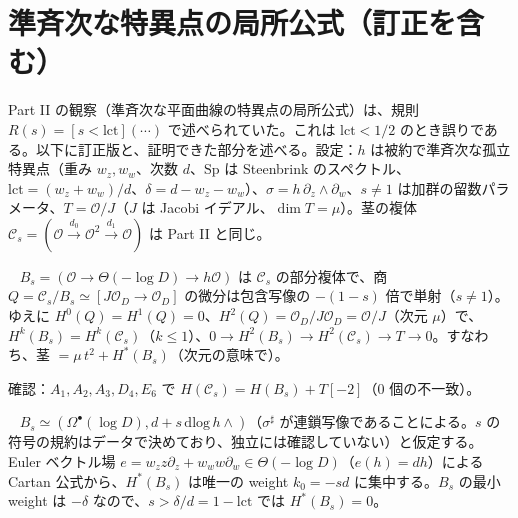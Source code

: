 \section{準斉次な特異点の局所公式（訂正を含む）}\label{p3:sec:local}
Part II の観察（準斉次な平面曲線の特異点の局所公式）は、規則 $R(s)=[s<\mathrm{lct}](\cdots)$ で述べられていた。これは $\mathrm{lct}<1/2$ のとき誤りである。以下に訂正版と、証明できた部分を述べる。設定：$h$ は被約で準斉次な孤立特異点（重み $w_z,w_w$、次数 $d$、$\mathrm{Sp}$ は Steenbrink のスペクトル、$\mathrm{lct}=(w_z+w_w)/d$、$\delta=d-w_z-w_w$）、$\sigma=h\,\partial_z\wedge\partial_w$、$s\ne1$ は加群の留数パラメータ、$T=\mathcal O/J$（$J$ は Jacobi イデアル、$\dim T=\mu$）。茎の複体 $\mathcal C_s=(\mathcal O\xrightarrow{d_0}\mathcal O^2\xrightarrow{d_1}\mathcal O)$ は Part II と同じ。
\begin{prop}\tP\ \tV\label{p3:prop:Q}
$B_s=(\mathcal O\to\Theta(-\log D)\to h\mathcal O)$ は $\mathcal C_s$ の部分複体で、商 $Q=\mathcal C_s/B_s\simeq[J\mathcal O_D\to\mathcal O_D]$ の微分は包含写像の $-(1-s)$ 倍で単射（$s\ne1$）。ゆえに $H^0(Q)=H^1(Q)=0$、$H^2(Q)=\mathcal O_D/J\mathcal O_D=\mathcal O/J$（次元 $\mu$）で、$H^k(B_s)=H^k(\mathcal C_s)$（$k\le1$）、$0\to H^2(B_s)\to H^2(\mathcal C_s)\to T\to0$。すなわち、茎 $=\mu\,t^2+H^*(B_s)$（次元の意味で）。
\end{prop}
\noindent 確認：$A_1,A_2,A_3,D_4,E_6$ で $H(\mathcal C_s)=H(B_s)+T[-2]$（0 個の不一致）\tV。
\begin{prop}\tP\ \tQ\label{p3:prop:weight}
$B_s\simeq(\Omega^\bullet(\log D),d+s\,\mathrm{dlog}\,h\wedge)$（$\sigma^\sharp$ が連鎖写像であることによる。$s$ の符号の規約はデータで決めており、独立には確認していない）と仮定する。Euler ベクトル場 $e=w_zz\partial_z+w_ww\partial_w\in\Theta(-\log D)$（$e(h)=dh$）による Cartan 公式から、$H^*(B_s)$ は唯一の weight $k_0=-sd$ に集中する。$B_s$ の最小 weight は $-\delta$ なので、$s>\delta/d=1-\mathrm{lct}$ では $H^*(B_s)=0$。
\end{prop}
